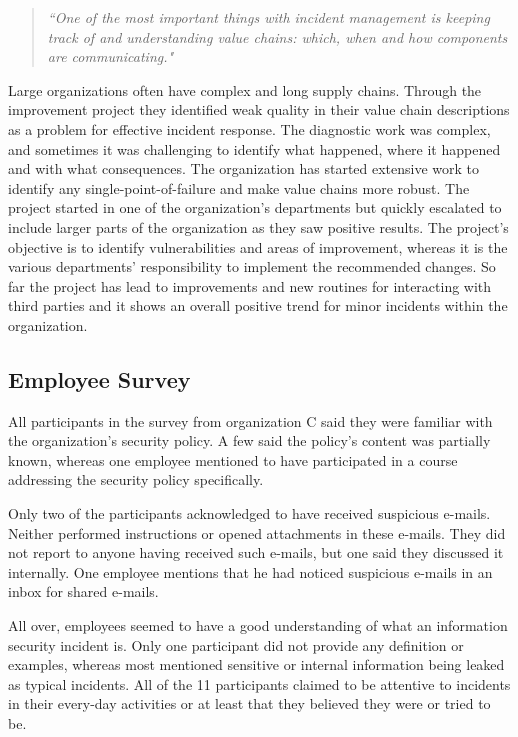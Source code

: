 \begin{quote}
\textit{``One of the most important things with incident management is keeping track of and understanding value chains: which, when and how components are communicating."}
\end{quote}

Large organizations often have complex and long supply chains. Through the improvement project they identified weak quality in their value chain descriptions as a problem for effective incident response. The diagnostic work was complex, and sometimes it was challenging to identify what happened, where it happened and with what consequences. The organization has started extensive work to identify any single-point-of-failure and make value chains more robust. The project started in one of the organization's departments but quickly escalated to include larger parts of the organization as they saw positive results. The project's objective is to identify vulnerabilities and areas of improvement, whereas it is the various departments' responsibility to implement the recommended changes. So far the project has lead to improvements and new routines for interacting with third parties and it shows an overall positive trend for minor incidents within the organization. 

\subsection{Employee Survey}
All participants in the survey from organization C said they were familiar with the organization's security policy. A few said the policy's content was partially known, whereas one employee mentioned to have participated in a course addressing the security policy specifically.

Only two of the participants acknowledged to have received suspicious e-mails. Neither performed instructions or opened attachments in these e-mails. They did not report to anyone having received such e-mails, but one said they discussed it internally. One employee mentions that he had noticed suspicious e-mails in an inbox for shared e-mails. 

All over, employees seemed to have a good understanding of what an information security incident is. Only one participant did not provide any definition or examples, whereas most mentioned sensitive or internal information being leaked as typical incidents. All of the 11 participants claimed to be attentive to incidents in their every-day activities or at least that they believed they were or tried to be.

